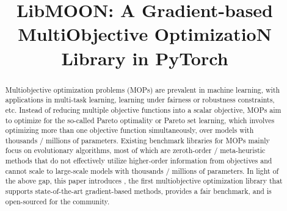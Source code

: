 \title{LibMOON: A Gradient-based MultiObjective OptimizatioN Library in PyTorch}



\maketitle
\begin{abstract}
    Multiobjective optimization problems (MOPs) are prevalent in machine learning, with applications in multi-task learning, learning under fairness or robustness constraints, etc. Instead of reducing multiple objective functions into a scalar objective, MOPs aim to optimize for the so-called Pareto optimality or Pareto set learning, which involves optimizing more than one objective function simultaneously, over models with thousands / millions of parameters. Existing benchmark libraries for MOPs mainly focus on evolutionary algorithms, most of which are zeroth-order / meta-heuristic methods that do not effectively utilize higher-order information from objectives and cannot scale to large-scale models with thousands / millions of parameters. In light of the above gap, this paper introduces \algoname, the first multiobjective optimization library that supports state-of-the-art gradient-based methods, provides a fair benchmark, and is open-sourced for the community.
\end{abstract}


